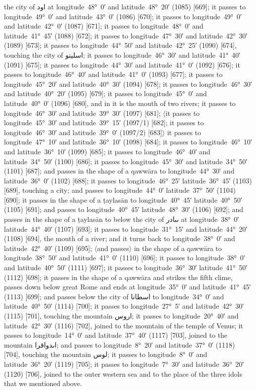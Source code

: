 \documentclass[11pt]{article}
\newcommand{\Pg}[1]{\marginpar{\footnotesize #1}}
\newcommand{\Ang}[1]{\ensuremath{#1}}
\begin{document}
the city of \textarabic{اود} at longitude~48°~0′ and latitude~48°~20′ (1085) [669]; it passes to longitude~49°~0′ and latitude~43°~0′ (1086) [670]; it passes to longitude~49°~0′ and latitude~42°~0′ (1087) [671]; it passes to longitude~48°~0′ and latitude~41°~45′ (1088) [672]; it passes to longitude~47°~30′ and latitude~42°~30′ (1089) [673]; it passes to longitude~44°~50′ and latitude~42°~25′ (1090) [674], touching the city of \textarabic{اسلينو}; it passes to longitude~46°~30′ and latitude~41°~40′ (1091) [675]; it passes to longitude~44°~30′ and latitude~41°~0′ (1092) [676]; it passes to longitude~46°~40′ and latitude~41°~0′ (1093) [677]; it passes to longitude~45°~20′ and latitude~40°~30′ (1094) [678]; it passes to longitude~46°~30′ and latitude~40°~20′ (1095) [679]; it passes to longitude~45°~0′ and latitude~40°~0′ (1096) [680], and in it is the mouth of two rivers; it passes to longitude~46°~30′ and latitude~39°~30′ (1097) [681]; \Ang{\langle}it passes to longitude~45°~30′ and latitude~39°~15′ (1097/1) [682]; it passes to longitude~46°~30′ and latitude~39°~0′ (1097/2) [683]\Ang{\rangle} it passes to longitude~47°~10′ and latitude~36°~10′ (1098) [684]\Pg{p. 73}; it passes to longitude~46°~10′ and latitude~36°~10′ (1099) [685]; it passes to longitude~46°~40′ and latitude~34°~50′ (1100) [686]; it passes to longitude~45°~30′ and latitude~34°~50′ (1101) [687]; and passes in the shape of a qawwāra to longitude~44°~30′ and latitude~36°~0′ (1102) [688]; it passes to longitude~46°~25′ latitude~36°~45′ (1103) [689], touching a city; and passes to longitude~44°~0′ latitude~37°~50′ (1104) [690]; it passes in the shape of a ṭaylasān to longitude~40°~45′ latitude~40°~50′ (1105) [691]; and passes to longitude~40°~45′ latitude~48°~30′ (1106) [692]; and passes in the shape of a ṭaylasān to below the city of \textarabic{ٮٮادر} at longitude~38°~0′ latitude~44°~40′ (1107) [693]; it passes to longitude~31°~15′ and latitude~44°~20′ (1108) [694], the mouth of a river; and it turns back to longitude~38°~0′ and latitude~42°~40′ (1109) [695]; \Ang{\langle}and passes\Ang{\rangle} in the shape of a qawwāra to longitude~38°~50′ and latitude~41°~0′ (1110) [696]; it passes to longitude~38°~0′ and latitude~40°~50′ (1111) [697]; it passes to longitude~36°~30′ latitude~41°~50′ (1112) [698]; it passes in the shape of a qawwāra and strikes the fifth clime, passes down below great Rome and ends at longitude~35°~0′ and latitude~41°~45′ (1113) [699]; and passes below the city of \textarabic{اسطانا} to longitude~34°~0′ and latitude~40°~50′ (1114) [700]; it passes to longitude~27°~5′ and latitude~42°~30′ (1115) [701], touching the mountain \textarabic{اروس}; it passes to longitude~20°~40′ and latitude~42°~30′ (1116) [702], joined to the mountain of the temple of Venus; it passes to longitude~14°~0′ and latitude~37°~40′ (1117) [703]\Pg{p. 74}, joined to the mountain \textarabic{اٮدواقرا}; and passes to longitude~8°~20′ and latitude~37°~0′ (1118) [704], touching the mountain \textarabic{لوس}; it passes to longitude~8°~0′ and latitude~36°~20′ (1119) [705]; it passes to longitude~7°~30′ and latitude~36°~20′ (1120) [706], joined to the outer western sea and to the place of the three idols that we mentioned above.
\end{document}
